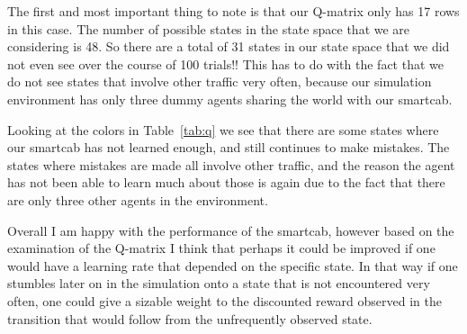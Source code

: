 \documentclass[conference]{IEEEtran}
\begin{document}
The first and most important thing to note is that our Q-matrix only has 
17 rows in this case.  The number of possible states in the state space that we
are considering is 48.  So there are a total of 31 states in our state space
that we did not even see over the course of 100 trials!!  This has to do with
the fact that we do not see states that involve other traffic very often, 
because our simulation environment has only three dummy agents sharing the
world with our smartcab. 

Looking at the colors in Table~\ref{tab:q} we see that there are some states
where our smartcab has not learned enough, and still continues to make
mistakes.  The states where mistakes are made all involve other traffic, and 
the reason the agent has not been able to learn much about those is again due
to the fact that there are only three other agents in the environment. 


Overall I am happy with the performance of the smartcab, however based on the
examination of the Q-matrix I think that perhaps it could be improved if one
would have a learning rate that depended on the specific state.  In that way
if one stumbles later on in the simulation onto a state that is not encountered
very often, one could give a sizable weight to the discounted reward observed
in the transition that would follow from the unfrequently observed state. 

% 
% 


\end{document}
